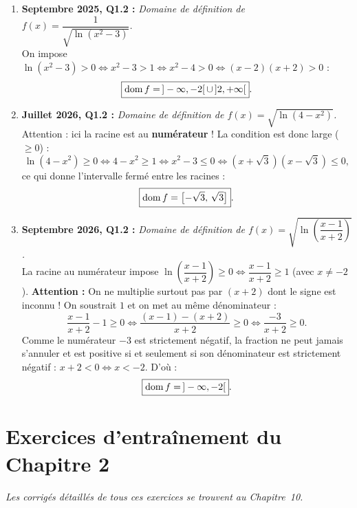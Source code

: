 \begin{exemple}
\begin{enumerate}
    \item \textbf{Septembre 2025, Q1.2 :} \emph{Domaine de définition de $f(x) = \dfrac{1}{\sqrt{\ln(x^2 - 3)}}$.}\\
    On impose $\ln(x^2 - 3) > 0 \iff x^2 - 3 > 1 \iff x^2 - 4 > 0 \iff (x - 2)(x + 2) > 0$ :
    \[
        \boxed{\operatorname{dom} f = \,]-\infty, -2[ \,\cup\, ]2, +\infty[}.
    \]

    \item \textbf{Juillet 2026, Q1.2 :} \emph{Domaine de définition de $f(x) = \sqrt{\ln(4 - x^2)}$.}\\
    Attention : ici la racine est au \textbf{numérateur} ! La condition est donc large ($\ge 0$) :
    \[
        \ln(4 - x^2) \ge 0 \iff 4 - x^2 \ge 1 \iff x^2 - 3 \le 0 \iff (x + \sqrt{3})(x - \sqrt{3}) \le 0,
    \]
    ce qui donne l'intervalle fermé entre les racines :
    \[
        \boxed{\operatorname{dom} f = \bigl[-\sqrt{3},\, \sqrt{3}\bigr]}.
    \]

    \item \textbf{Septembre 2026, Q1.2 :} \emph{Domaine de définition de $f(x) = \sqrt{\ln\left(\dfrac{x - 1}{x + 2}\right)}$.}\\
    La racine au numérateur impose $\ln\left(\dfrac{x - 1}{x + 2}\right) \ge 0 \iff \dfrac{x - 1}{x + 2} \ge 1$ (avec $x \neq -2$).
    \textbf{Attention :} On ne multiplie surtout pas par $(x + 2)$ dont le signe est inconnu ! On soustrait $1$ et on met au même dénominateur :
    \[
        \frac{x - 1}{x + 2} - 1 \ge 0 \iff \frac{(x - 1) - (x + 2)}{x + 2} \ge 0 \iff \frac{-3}{x + 2} \ge 0.
    \]
    Comme le numérateur $-3$ est strictement négatif, la fraction ne peut jamais s'annuler et est positive si et seulement si son dénominateur est strictement négatif : $x + 2 < 0 \iff x < -2$. D'où :
    \[
        \boxed{\operatorname{dom} f = \,]-\infty, -2[}.
    \]
\end{enumerate}
\end{exemple}

\section{Exercices d'entraînement du Chapitre 2}

\emph{Les corrigés détaillés de tous ces exercices se trouvent au Chapitre~10.}

